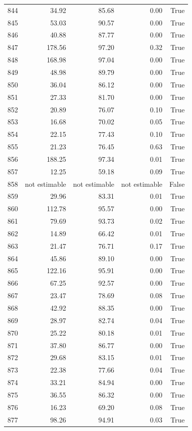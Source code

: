 \begin{longtable}{rrrrr}
844 & 34.92 & 85.68 & 0.00 & True \\
845 & 53.03 & 90.57 & 0.00 & True \\
846 & 40.88 & 87.77 & 0.00 & True \\
847 & 178.56 & 97.20 & 0.32 & True \\
848 & 168.98 & 97.04 & 0.00 & True \\
849 & 48.98 & 89.79 & 0.00 & True \\
850 & 36.04 & 86.12 & 0.00 & True \\
851 & 27.33 & 81.70 & 0.00 & True \\
852 & 20.89 & 76.07 & 0.10 & True \\
853 & 16.68 & 70.02 & 0.05 & True \\
854 & 22.15 & 77.43 & 0.10 & True \\
855 & 21.23 & 76.45 & 0.63 & True \\
856 & 188.25 & 97.34 & 0.01 & True \\
857 & 12.25 & 59.18 & 0.09 & True \\
858 & not estimable & not estimable & not estimable & False \\
859 & 29.96 & 83.31 & 0.01 & True \\
860 & 112.78 & 95.57 & 0.00 & True \\
861 & 79.69 & 93.73 & 0.02 & True \\
862 & 14.89 & 66.42 & 0.01 & True \\
863 & 21.47 & 76.71 & 0.17 & True \\
864 & 45.86 & 89.10 & 0.00 & True \\
865 & 122.16 & 95.91 & 0.00 & True \\
866 & 67.25 & 92.57 & 0.00 & True \\
867 & 23.47 & 78.69 & 0.08 & True \\
868 & 42.92 & 88.35 & 0.00 & True \\
869 & 28.97 & 82.74 & 0.04 & True \\
870 & 25.22 & 80.18 & 0.01 & True \\
871 & 37.80 & 86.77 & 0.00 & True \\
872 & 29.68 & 83.15 & 0.01 & True \\
873 & 22.38 & 77.66 & 0.04 & True \\
874 & 33.21 & 84.94 & 0.00 & True \\
875 & 36.55 & 86.32 & 0.00 & True \\
876 & 16.23 & 69.20 & 0.08 & True \\
877 & 98.26 & 94.91 & 0.03 & True \\

\end{longtable}
